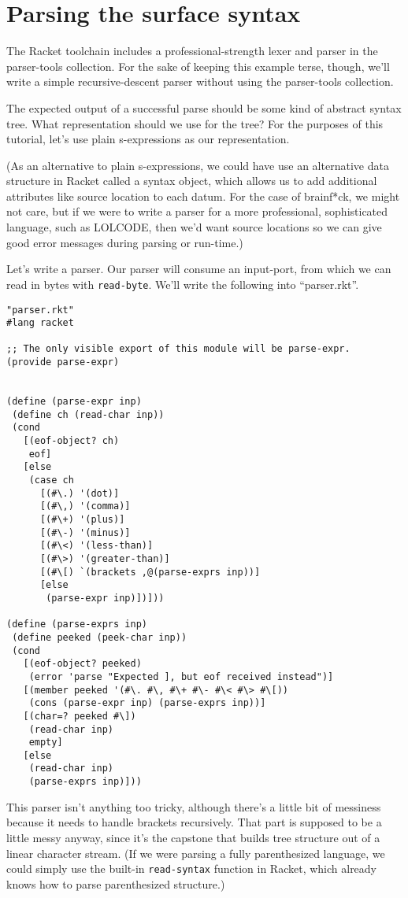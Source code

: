 \documentclass{article}
\begin{document}
\section{Parsing the surface syntax}

The Racket toolchain includes a professional-strength lexer and parser
in the parser-tools collection.  For the sake of keeping this example
terse, though, we'll write a simple recursive-descent parser without
using the parser-tools collection.

The expected output of a successful parse should be some kind of
abstract syntax tree. What representation should we use for the tree?
For the purposes of this tutorial, let's use plain s-expressions as
our representation.

(As an alternative to plain s-expressions, we could have use an
alternative data structure in Racket called a syntax object, which
allows us to add additional attributes like source location to each
datum.  For the case of brainf*ck, we might not care, but if we were
to write a parser for a more professional, sophisticated language,
such as LOLCODE, then we'd want source locations so we can give good
error messages during parsing or run-time.)


Let's write a parser. Our parser will consume an input-port, from
which we can read in bytes with
\verb|read-byte|.  We'll write the following into ``parser.rkt''.
\begin{verbatim}
"parser.rkt"
#lang racket

;; The only visible export of this module will be parse-expr.
(provide parse-expr)


(define (parse-expr inp)
 (define ch (read-char inp))
 (cond
   [(eof-object? ch)
    eof]
   [else
    (case ch
      [(#\.) '(dot)]
      [(#\,) '(comma)]
      [(#\+) '(plus)]
      [(#\-) '(minus)]
      [(#\<) '(less-than)]
      [(#\>) '(greater-than)]
      [(#\[) `(brackets ,@(parse-exprs inp))]
      [else
       (parse-expr inp)])]))

(define (parse-exprs inp)
 (define peeked (peek-char inp))
 (cond
   [(eof-object? peeked)
    (error 'parse "Expected ], but eof received instead")]
   [(member peeked '(#\. #\, #\+ #\- #\< #\> #\[))
    (cons (parse-expr inp) (parse-exprs inp))]
   [(char=? peeked #\])
    (read-char inp)
    empty]
   [else
    (read-char inp)
    (parse-exprs inp)]))

\end{verbatim}

This parser isn't anything too tricky, although there's a little bit
of messiness because it needs to handle brackets recursively. That
part is supposed to be a little messy anyway, since it's the capstone
that builds tree structure out of a linear character stream.  (If we
were parsing a fully parenthesized language, we could simply use the
built-in \verb|read-syntax| function in Racket, which already knows
how to parse parenthesized structure.)
\end{document}
